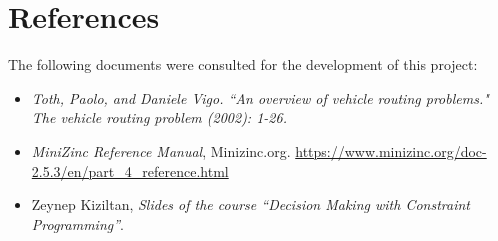 \documentclass[main.tex]{subfiles}
\begin{document}
\section{References}
\label{sec:references}

The following documents were consulted for the development of this project:
\begin{itemize}
    \item \textit{Toth, Paolo, and Daniele Vigo. ``An overview of vehicle routing problems." The vehicle routing problem (2002): 1-26.}
    \item \textit{MiniZinc Reference Manual}, Minizinc.org. \href{https://www.minizinc.org/doc-2.5.3/en/part_4_reference.html}{https://www.minizinc.org/doc-2.5.3/en/part\_4\_reference.html}
    \item Zeynep Kiziltan, \textit{Slides of the course ``Decision Making with Constraint Programming''}.
\end{itemize}
\end{document}
